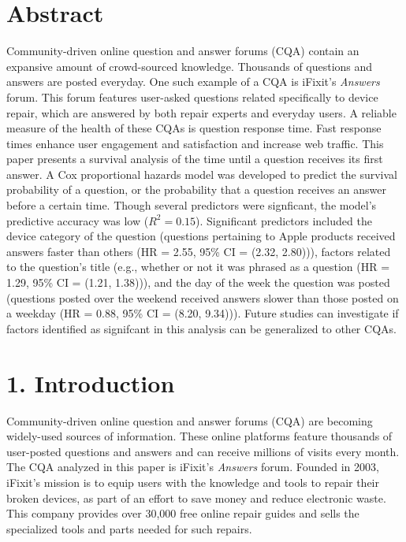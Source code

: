 \documentclass{article}
\begin{document}


\makeatletter
\DeclareRobustCommand\bfseries{%
  \not@math@alphabet\bfseries\mathbf
  \fontseries\bfdefault\selectfont
  \boldmath %
}
\makeatother



\section*{Abstract}

Community-driven online question and answer forums (CQA) contain an expansive amount of crowd-sourced knowledge. Thousands of questions and answers are posted everyday. One such example of a CQA is iFixit's \textit{Answers} forum. This forum features user-asked questions related specifically to device repair, which are answered by both repair experts and everyday users. A reliable measure of the health of these CQAs is question response time. Fast response times enhance user engagement and satisfaction and increase web traffic. This paper presents a survival analysis of the time until a question receives its first answer. A Cox proportional hazards model was developed to predict the survival probability of a question, or the probability that a question receives an answer before a certain time. Though several predictors were signficant, the model's predictive accuracy was low ($R^2 = 0.15$). Significant predictors included the device category of the question (questions pertaining to Apple products received answers faster than others (HR = 2.55, 95\% CI = (2.32, 2.80))), factors related to the question's title (e.g., whether or not it was phrased as a question (HR = 1.29, 95\% CI = (1.21, 1.38))), and the day of the week the question was posted (questions posted over the weekend received answers slower than those posted on a weekday (HR = 0.88, 95\% CI = (8.20, 9.34))). Future studies can investigate if factors identified as signifcant in this analysis can be generalized to other CQAs. 


\section*{1. Introduction}

Community-driven online question and answer forums (CQA) are becoming widely-used sources of information. These online platforms feature thousands of user-posted questions and answers and can receive millions of visits every month. The CQA analyzed in this paper is iFixit's \textit{Answers} forum. Founded in 2003, iFixit's mission is to equip users with the knowledge and tools to repair their broken devices, as part of an effort to save money and reduce electronic waste. This company provides over 30,000 free online repair guides and sells the specialized tools and parts needed for such repairs.
    
\end{document}

